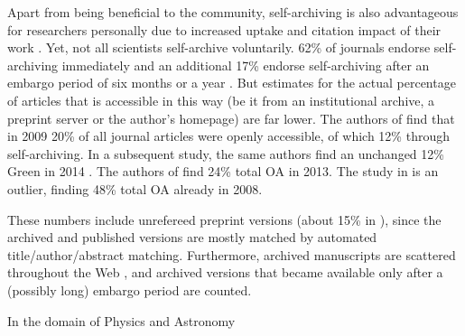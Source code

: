 \documentclass[11pt, openany, oneside, article, a4paper, twocolumn]{memoir}
\begin{document}
Apart from being beneficial to the community, self-archiving is also
advantageous for researchers personally due to increased uptake and
citation impact of their work \cite{gargouri2010self}.
Yet, not all scientists self-archive voluntarily. 
62\% of journals endorse self-archiving immediately and an additional
17\% endorse self-archiving after an embargo period of six months or
a year \cite{bjork2014anatomy}. But estimates for the actual percentage of
articles that is accessible in this way (be it from an institutional
archive, a preprint server or the author's homepage) are far lower. The
authors of \cite{bjork2010open} find that in 2009 20\% of all 
journal articles were openly accessible, of which 12\% through
self-archiving. In a subsequent study, the same authors find an unchanged
12\% Green in 2014 \cite{bjork2014anatomy}. The authors of
\cite{khabsa2014number} find 24\% total OA in 2013. The study in
\cite{archambault2013tipping} is an outlier, finding 48\% total OA already
in 2008.

These numbers include unrefereed preprint versions (about 15\% in
\cite{bjork2014anatomy}), since the archived and published versions are
mostly matched by automated title/author/abstract matching. Furthermore,
archived manuscripts are scattered throughout the Web
\cite{kim2010faculty}, and archived versions that became available only
after a (possibly long) embargo period are counted.

In the domain of Physics and Astronomy
\end{document}
